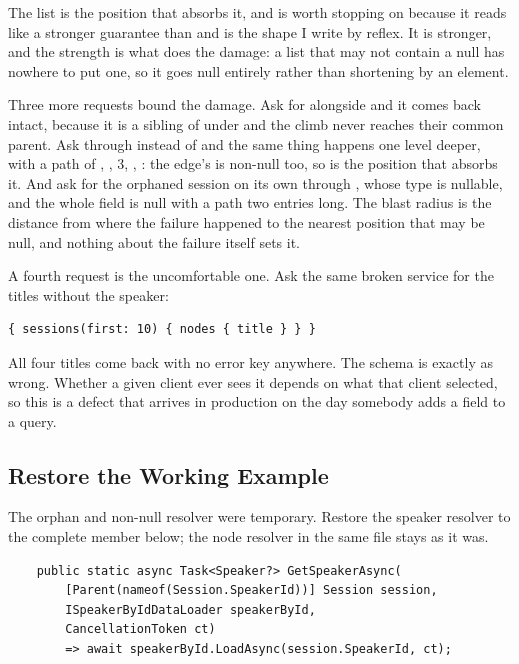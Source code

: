 %
The list is the position that absorbs it, and \code{[Session!]} is worth
stopping on because it reads like a stronger guarantee than \code{[Session]}
and is the shape I write by reflex. It is stronger, and the strength is what
does the damage: a list that may not contain a null has nowhere to put one, so
it goes null entirely rather than shortening by an element.

%
Three more requests bound the damage. Ask for  alongside and it
comes back intact, because it is a sibling of  under
 and the climb never reaches their common parent. Ask through
 instead of  and the same thing happens one level
deeper, with a path of , , 3, ,
: the edge's  is non-null too, so  is the
position that absorbs it. And ask for the orphaned session on its own through
, whose type is nullable, and the whole field is null with a
path two entries long. The blast radius is the distance from where the failure
happened to the nearest position that may be null, and nothing about the
failure itself sets it.

%
A fourth request is the uncomfortable one. Ask the same broken service for
the titles without the speaker:

\begin{verbatim}
{ sessions(first: 10) { nodes { title } } }
\end{verbatim}

All four titles come back with no error key anywhere. The schema is exactly as wrong.
Whether a given client ever sees it depends on what that client selected, so
this is a defect that arrives in production on the day somebody adds a field to
a query.

\subsection{Restore the Working Example}

The orphan and non-null resolver were temporary. Restore the speaker resolver
to the complete member below; the node resolver in the same file stays as it
was.

\begin{verbatim}
    public static async Task<Speaker?> GetSpeakerAsync(
        [Parent(nameof(Session.SpeakerId))] Session session,
        ISpeakerByIdDataLoader speakerById,
        CancellationToken ct)
        => await speakerById.LoadAsync(session.SpeakerId, ct);
\end{verbatim}

